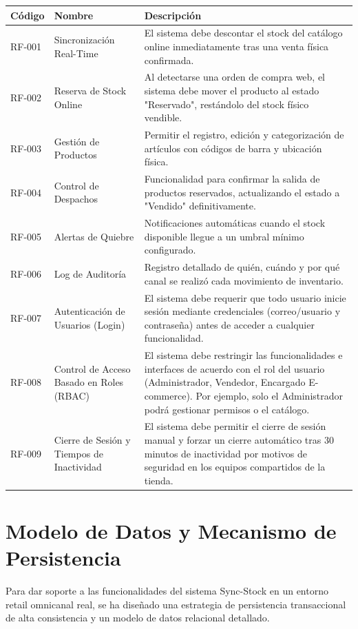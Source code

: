 \documentclass[12pt,a4paper]{article}
\begin{document}
\begin{table}
\centering
\begin{tabularx}{\textwidth}{|l|l|X|}
\hline
\textbf{Código} & \textbf{Nombre} & \textbf{Descripción} \\ \hline
RF-001 & Sincronización Real-Time & El sistema debe descontar el stock del catálogo online inmediatamente tras una venta física confirmada. \\ \hline
RF-002 & Reserva de Stock Online & Al detectarse una orden de compra web, el sistema debe mover el producto al estado "Reservado", restándolo del stock físico vendible. \\ \hline
RF-003 & Gestión de Productos & Permitir el registro, edición y categorización de artículos con códigos de barra y ubicación física. \\ \hline
RF-004 & Control de Despachos & Funcionalidad para confirmar la salida de productos reservados, actualizando el estado a "Vendido" definitivamente. \\ \hline
RF-005 & Alertas de Quiebre & Notificaciones automáticas cuando el stock disponible llegue a un umbral mínimo configurado. \\ \hline
RF-006 & Log de Auditoría & Registro detallado de quién, cuándo y por qué canal se realizó cada movimiento de inventario. \\ \hline
RF-007 & Autenticación de Usuarios (Login) & El sistema debe requerir que todo usuario inicie sesión mediante credenciales (correo/usuario y contraseña) antes de acceder a cualquier funcionalidad. \\ \hline
RF-008 & Control de Acceso Basado en Roles (RBAC) & El sistema debe restringir las funcionalidades e interfaces de acuerdo con el rol del usuario (Administrador, Vendedor, Encargado E-commerce). Por ejemplo, solo el Administrador podrá gestionar permisos o el catálogo. \\ \hline
RF-009 & Cierre de Sesión y Tiempos de Inactividad & El sistema debe permitir el cierre de sesión manual y forzar un cierre automático tras 30 minutos de inactividad por motivos de seguridad en los equipos compartidos de la tienda. \\ \hline
\end{tabularx}
\end{table}

\newpage

\section{Modelo de Datos y Mecanismo de Persistencia}
Para dar soporte a las funcionalidades del sistema Sync-Stock en un entorno retail omnicanal real, se ha diseñado una estrategia de persistencia transaccional de alta consistencia y un modelo de datos relacional detallado.
\end{document}
